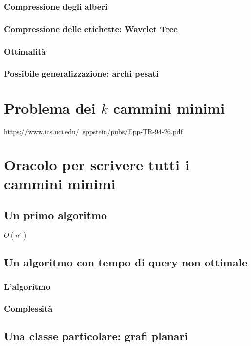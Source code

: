 \documentclass[a4paper,10pt]{amsbook}
\theoremstyle{plain}
\theoremstyle{definition}
\theoremstyle{remark}
\begin{document}
\subsection{Compressione degli alberi}

\subsection{Compressione delle etichette: Wavelet Tree}

\subsection{Ottimalità}

\subsection{Possibile generalizzazione: archi pesati}


\chapter{Problema dei $k$ cammini minimi}

https://www.ics.uci.edu/~eppstein/pubs/Epp-TR-94-26.pdf

\chapter{Oracolo per scrivere tutti i cammini minimi}
\label{chap:oracolotutticammini}

\section{Un primo algoritmo}

$O(n^3)$

\section{Un algoritmo con tempo di query non ottimale}

\subsection{L'algoritmo}

\subsection{Complessità}

\section{Una classe particolare: grafi planari}
\end{document}
